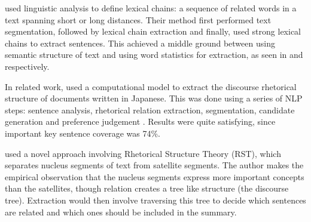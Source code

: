 \documentclass[BTech]{nitgoathesis}
\begin{document}
\cite{barz} used linguistic analysis to define lexical chains: a sequence of related words in a text spanning short or long distances. Their method first performed text segmentation, followed by lexical chain extraction and finally, used strong lexical chains to extract sentences. This achieved a middle ground between using semantic structure of text and using word statistics for extraction, as seen in \cite{mck} and \cite{lun} respectively.
\par
In related work, \cite{ono} used a computational model to extract the discourse rhetorical structure of documents written in Japanese. This was done using a series of NLP steps: sentence analysis, rhetorical relation extraction, segmentation, candidate generation and preference judgement \cite{survey}. Results were quite satisfying, since important key sentence coverage was 74\%. 
\par
\cite{marc} used a novel approach involving Rhetorical Structure Theory (RST), which separates nucleus segments of text from satellite segments. The author makes the empirical observation that the nucleus segments express more important concepts than the satellites, though relation creates a tree like structure (the discourse tree). Extraction would then involve traversing this tree to decide which sentences are related and which ones should be included in the summary.
\end{document}
